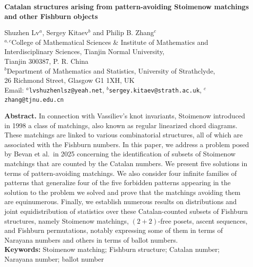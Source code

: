 \documentclass[11pt]{article}
\begin{document}
	
	\begin{center}
		{\large \bf Catalan structures arising from pattern-avoiding Stoimenow matchings and other Fishburn objects}
	\end{center}
	
	\begingroup
	\renewcommand{\thefootnote}{\fnsymbol{footnote}}
	\begin{center}
		Shuzhen Lv$^{a}$, Sergey Kitaev$^{b}$ and Philip B. Zhang$^{c}$
		\\[6pt]
		
		$^{a,c}$College of Mathematical Sciences \& Institute of Mathematics and Interdisciplinary Sciences, Tianjin Normal University, \\ Tianjin  300387, P. R. China\\[6pt]
		
		$^{b}$Department of Mathematics and Statistics, University of Strathclyde, \\ 26 Richmond Street, Glasgow G1 1XH, UK\\[6pt]
		
		Email:  $^{a}${\tt  lvshuzhenlsz@yeah.net},
		$^{b}${\tt sergey.kitaev@strath.ac.uk},
		$^{c}${\tt zhang@tjnu.edu.cn}
	\end{center}

	\endgroup
	
	
	\noindent\textbf{Abstract.}
	In connection with Vassiliev's knot invariants, Stoimenow introduced in 1998 a class of matchings, also known as regular linearized chord diagrams. These matchings are linked to various combinatorial structures, all of which are associated with the Fishburn numbers. In this paper, we address a problem posed by Bevan et al.\ in 2025 concerning the identification of subsets of Stoimenow matchings that are counted by the Catalan numbers. We present five solutions in terms of pattern-avoiding matchings. We also consider four infinite families of patterns that generalize four of the five forbidden patterns appearing in the solution to the problem we solved and prove that the matchings avoiding them are equinumerous. Finally, we establish numerous results on distributions and joint equidistribution of statistics over these Catalan-counted subsets of Fishburn structures, namely Stoimenow matchings, $(2+2)$-free posets, ascent sequences, and Fishburn permutations, notably expressing some of them in terms of Narayana numbers and others in terms of ballot numbers. \\[-3mm]
	
	\noindent\textbf{\bf Keywords:} Stoimenow matching; Fishburn structure; Catalan number; Narayana number; ballot number\\[-3mm]
	
\end{document}
